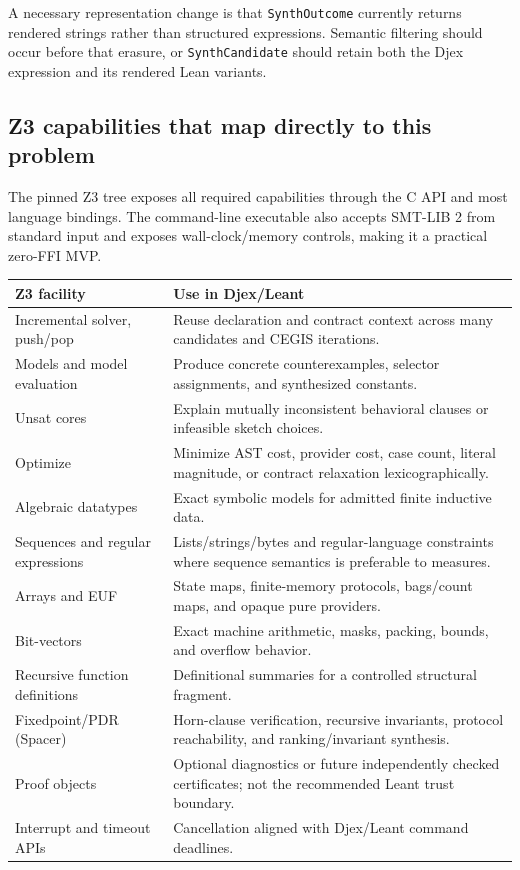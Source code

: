\documentclass[11pt,oneside]{article}
\newcommand{\code}[1]{\texttt{#1}}
\begin{document}
A necessary representation change is that \code{SynthOutcome} currently returns
rendered strings rather than structured expressions. Semantic filtering should occur
before that erasure, or \code{SynthCandidate} should retain both the Djex expression
and its rendered Lean variants.

\subsection{Z3 capabilities that map directly to this problem}

The pinned Z3 tree exposes all required capabilities through the C API and most
language bindings. The command-line executable also accepts SMT-LIB 2 from standard
input and exposes wall-clock/memory controls, making it a practical zero-FFI MVP.

\begin{longtable}{@{}p{}p{}@{}}
\toprule
\textbf{Z3 facility} & \textbf{Use in Djex/Leant} \\
\midrule
\endhead
Incremental solver, push/pop & Reuse declaration and contract context across many
candidates and CEGIS iterations. \\
Models and model evaluation & Produce concrete counterexamples, selector assignments,
and synthesized constants. \\
Unsat cores & Explain mutually inconsistent behavioral clauses or infeasible sketch
choices. \\
Optimize & Minimize AST cost, provider cost, case count, literal magnitude, or
contract relaxation lexicographically. \\
Algebraic datatypes & Exact symbolic models for admitted finite inductive data. \\
Sequences and regular expressions & Lists/strings/bytes and regular-language
constraints where sequence semantics is preferable to measures. \\
Arrays and EUF & State maps, finite-memory protocols, bags/count maps, and opaque pure
providers. \\
Bit-vectors & Exact machine arithmetic, masks, packing, bounds, and overflow behavior. \\
Recursive function definitions & Definitional summaries for a controlled structural
fragment. \\
Fixedpoint/PDR (Spacer) & Horn-clause verification, recursive invariants, protocol
reachability, and ranking/invariant synthesis. \\
Proof objects & Optional diagnostics or future independently checked certificates;
not the recommended Leant trust boundary. \\
Interrupt and timeout APIs & Cancellation aligned with Djex/Leant command deadlines. \\
\bottomrule
\end{longtable}
\end{document}
